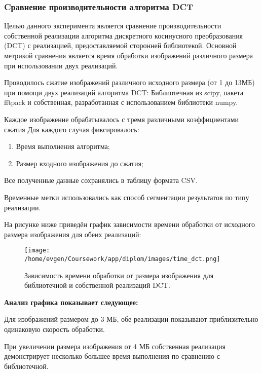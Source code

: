 \subsubsection{Cравнение производительности алгоритма DCT}

Целью данного эксперимента является сравнение производительности собственной реализации алгоритма 
дискретного косинусного преобразования (DCT) с реализацией, предоставляемой сторонней библиотекой. 
Основной метрикой сравнения является время обработки изображений различного размера при использовании 
двух реализаций.

Проводилось сжатие изображений различного исходного размера (от 1 до 13МБ) при помощи двух реализаций алгоритма DCT:
Библиотечная из scipy, пакета fftpack и собственная, разработанная с использованием библиотеки numpy.

Каждое изображение обрабатывалось с тремя различными коэффициентами сжатия
Для каждого случая фиксировалось:
\begin{enumerate}
    \item Время выполнения алгоритма;
    \item Размер входного изображения до сжатия;
\end{enumerate}

Все полученные данные сохранялись в таблицу формата CSV. 
\TimeDCTlib

\TimeDCTown

\FloatBarrier

Временные метки использовались как способ сегментации результатов по типу реализации.

На рисунке ниже приведён график зависимости времени обработки 
от исходного размера изображения для обеих реализаций:

\begin{figure}[H]
    \centering
    \texttt{[image: /home/evgen/Coursework/app/diplom/images/time\_dct.png]}
    \caption{Зависимость времени обработки от размера изображения для библиотечной и собственной реализаций DCT.}
    \label{fig:time_dct}
\end{figure}

\textbf{Анализ графика показывает следующее:}

Для изображений размером до 3 МБ, обе реализации показывают приблизительно одинаковую скорость обработки.

При увеличении размера изображения от 4 МБ собственная реализация демонстрирует несколько большее время 
выполнения по сравнению с библиотечной.

